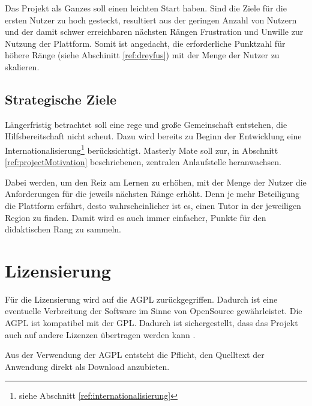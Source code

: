 Das Projekt als Ganzes soll einen leichten Start haben. Sind die Ziele für die
ersten Nutzer zu hoch gesteckt, resultiert aus der geringen Anzahl von Nutzern
und der damit schwer erreichbaren nächsten Rängen Frustration und Unwille zur
Nutzung der Plattform. Somit ist angedacht, die erforderliche Punktzahl für
höhere Ränge (siehe Abschinitt \ref{ref:dreyfus}) mit der Menge der Nutzer zu
skalieren.

\subsection{Strategische Ziele}
Längerfristig betrachtet soll eine rege und große Gemeinschaft entstehen, die
Hilfsbereitschaft nicht scheut. Dazu wird bereits zu Beginn der Entwicklung eine
Internationalisierung\footnote{siehe Abschnitt \ref{ref:internationalisierung}}
berücksichtigt. Masterly Mate soll zur, in Abschnitt \ref{ref:projectMotivation}
beschriebenen, zentralen Anlaufstelle heranwachsen.

Dabei werden, um den Reiz am Lernen zu erhöhen, mit der Menge der Nutzer die
Anforderungen für die jeweils nächsten Ränge erhöht. Denn je mehr Beteiligung
die Plattform erfährt, desto wahrscheinlicher ist es, einen Tutor in der
jeweiligen Region zu finden. Damit wird es auch immer einfacher, Punkte für den
didaktischen Rang zu sammeln.

\section{Lizensierung}
Für die Lizensierung wird auf die \ac{AGPL} zurückgegriffen. Dadurch ist eine
eventuelle Verbreitung der Software im Sinne von OpenSource gewährleistet. Die
AGPL ist kompatibel mit der \ac{GPL}. Dadurch ist sichergestellt, dass das
Projekt auch auf andere Lizenzen übertragen werden kann \cite{fsf:2007}.

Aus der Verwendung der AGPL entsteht die Pflicht, den Quelltext der Anwendung
direkt als Download anzubieten.

